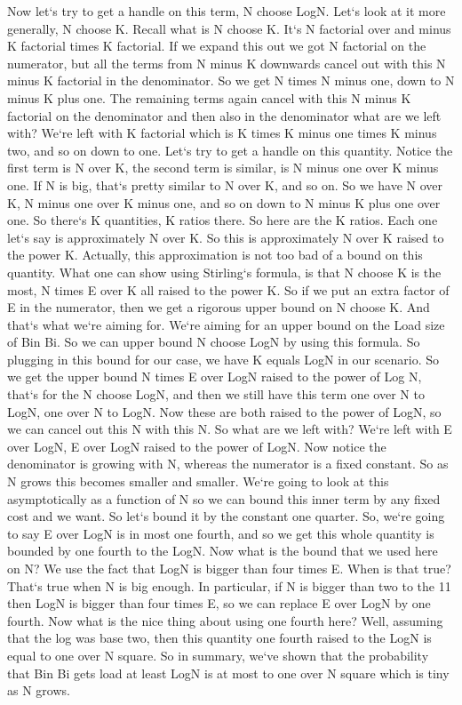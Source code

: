 Now let`s try to get a handle on this term, N choose LogN\@.
Let`s look at it more generally, N choose K\@.
Recall what is N choose K\@.
It`s N factorial over and minus K factorial times K factorial.
If we expand this out we got N factorial on the numerator, but all the terms from N minus K downwards cancel out with this N minus K factorial in the denominator.
So we get N times N minus one, down to N minus K plus one.
The remaining terms again cancel with this N minus K factorial on the denominator and then also in the denominator what are we left with? We`re left with K factorial which is K times K minus one times K minus two, and so on down to one.
Let`s try to get a handle on this quantity.
Notice the first term is N over K, the second term is similar, is N minus one over K minus one.
If N is big, that`s pretty similar to N over K, and so on.
So we have N over K, N minus one over K minus one, and so on down to N minus K plus one over one.
So there`s K quantities, K ratios there.
So here are the K ratios.
Each one let`s say is approximately N over K\@.
So this is approximately N over K raised to the power K\@.
Actually, this approximation is not too bad of a bound on this quantity.
What one can show using Stirling`s formula, is that N choose K is the most, N times E over K all raised to the power K\@.
So if we put an extra factor of E in the numerator, then we get a rigorous upper bound on N choose K\@.
And that`s what we`re aiming for.
We`re aiming for an upper bound on the Load size of Bin Bi.
So we can upper bound N choose LogN by using this formula.
So plugging in this bound for our case, we have K equals LogN in our scenario.
So we get the upper bound N times E over LogN raised to the power of Log N, that`s for the N choose LogN, and then we still have this term one over N to LogN, one over N to LogN\@.
Now these are both raised to the power of LogN, so we can cancel out this N with this N\@.
So what are we left with? We`re left with E over LogN, E over LogN raised to the power of LogN\@.
Now notice the denominator is growing with N, whereas the numerator is a fixed constant.
So as N grows this becomes smaller and smaller.
We`re going to look at this asymptotically as a function of N so we can bound this inner term by any fixed cost and we want.
So let`s bound it by the constant one quarter.
So, we`re going to say E over LogN is in most one fourth, and so we get this whole quantity is bounded by one fourth to the LogN\@.
Now what is the bound that we used here on N? We use the fact that LogN is bigger than four times E\@.
When is that true? That`s true when N is big enough.
In particular, if N is bigger than two to the 11 then LogN is bigger than four times E, so we can replace E over LogN by one fourth.
Now what is the nice thing about using one fourth here? Well, assuming that the log was base two, then this quantity one fourth raised to the LogN is equal to one over N square.
So in summary, we`ve shown that the probability that Bin Bi gets load at least LogN is at most to one over N square which is tiny as N grows.

